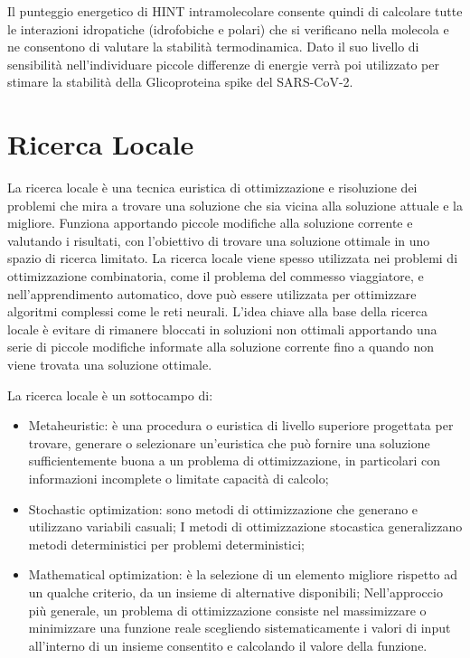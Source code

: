Il punteggio energetico di HINT intramolecolare consente quindi di calcolare tutte le interazioni idropatiche (idrofobiche e polari) che si verificano nella molecola e ne consentono di valutare la stabilità termodinamica. Dato il suo livello di sensibilità nell'individuare piccole differenze di energie verrà poi utilizzato per stimare la stabilità della Glicoproteina spike del SARS-CoV-2.

\section{Ricerca Locale}\label{sec:cap_sec_subsec}
La ricerca locale è una tecnica euristica di ottimizzazione e risoluzione dei problemi che mira a trovare una soluzione che sia vicina alla soluzione attuale e la migliore. 
Funziona apportando piccole modifiche alla soluzione corrente e valutando i risultati, con l'obiettivo di trovare una soluzione ottimale in uno spazio di ricerca 
limitato. La ricerca locale viene spesso utilizzata nei problemi di ottimizzazione combinatoria, come il problema del commesso viaggiatore, e nell'apprendimento 
automatico, dove può essere utilizzata per ottimizzare algoritmi complessi come le reti neurali. L'idea chiave alla base della ricerca locale è evitare di rimanere 
bloccati in soluzioni non ottimali apportando una serie di piccole modifiche informate alla soluzione corrente fino a quando non viene trovata una soluzione ottimale.

La ricerca locale è un sottocampo di:
\vspace{10pt}
\begin{itemize}
    \item Metaheuristic: è una procedura o euristica di livello superiore progettata per trovare, generare o selezionare un'euristica che può fornire una soluzione
    sufficientemente buona a un problema di ottimizzazione, in particolari con informazioni incomplete o limitate capacità di calcolo;
    \vspace{5pt}
    \item Stochastic optimization: sono metodi di ottimizzazione che generano e utilizzano variabili casuali; I metodi di ottimizzazione stocastica generalizzano metodi 
    deterministici per problemi deterministici;
    \vspace{5pt}
    \item Mathematical optimization: è la selezione di un elemento migliore rispetto ad un qualche criterio, da un insieme di alternative disponibili; Nell'approccio 
    più generale, un problema di ottimizzazione consiste nel massimizzare o minimizzare una funzione reale scegliendo sistematicamente i valori di input 
    all'interno di un insieme consentito e calcolando il valore della funzione.
\end{itemize}

